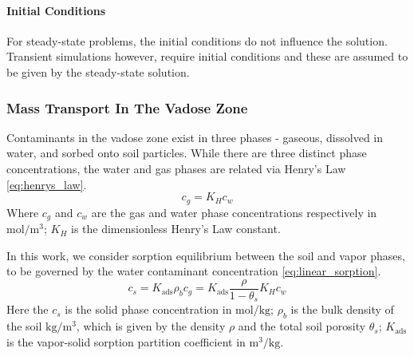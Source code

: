 \paragraph{Initial Conditions}

For steady-state problems, the initial conditions do not influence the solution.
Transient simulations however, require initial conditions and these are assumed to be given by the steady-state solution.\par

\subsubsection{Mass Transport In The Vadose Zone}\label{sec:mass_transport}

Contaminants in the vadose zone exist in three phases - gaseous, dissolved in water, and sorbed onto soil particles.
While there are three distinct phase concentrations, the water and gas phases are related via Henry's Law \eqref{eq:henrys_law}.
\begin{equation}\label{eq:henrys_law}
  c_g = K_H c_w
\end{equation}
Where $c_g$ and $c_w$ are the gas and water phase concentrations respectively in $\mathrm{mol/m^3}$;
$K_H$ is the dimensionless Henry's Law constant.\par

In this work, we consider sorption equilibrium between the soil and vapor phases, to be governed by the water contaminant concentration \eqref{eq:linear_sorption}.
\begin{equation}\label{eq:linear_sorption}
  c_s = K_\mathrm{ads} \rho_b c_g = K_\mathrm{ads} \frac{\rho}{1-\theta_s} K_H c_w
\end{equation}
Here the $c_s$ is the solid phase concentration in $\mathrm{mol/kg}$;
$\rho_b$ is the bulk density of the soil $\mathrm{kg/m^3}$, which is given by the density $\rho$ and the total soil porosity $\theta_s$;
$K_\mathrm{ads}$ is the vapor-solid sorption partition coefficient in $\mathrm{m^3/kg}$.\par

